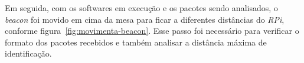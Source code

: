\documentclass[
	12pt,				%
	openright,			%
	oneside,			%
	a4paper,			%
	chapter=TITLE,		%
	english,			%
	brazil				%
	]{abntex2}
\begin{document}
{\begin{figure}[htb]
\end{figure}

Em seguida, com os softwares em execução e os pacotes sendo analisados, o \textit{beacon} foi movido em cima da mesa para ficar a diferentes distâncias do \textit{RPi}, conforme figura~\ref{fig:movimenta-beacon}. Esse passo foi necessário para verificar o formato dos pacotes recebidos e também analisar a distância máxima de identificação.

\begin{figure}[htb]
\end{figure}

}
\end{document}
